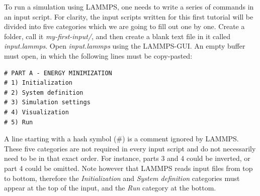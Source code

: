 \documentclass[9pt,tutorial]{livecoms}
\begin{document}
\noindent To run a simulation using LAMMPS, one needs to write a series of commands in an input script. For clarity, the input scripts written for this first tutorial will be divided into five categories which we are going to fill out one by one. Create a folder, call it \textit{my-first-input/}, and then create a blank text file in it called \textit{input.lammps}. Open \textit{input.lammps} using the LAMMPS-GUI. An empty buffer must open, in which the following lines must be copy-pasted:
{\normalsize \begin{verbatim}
# PART A - ENERGY MINIMIZATION
# 1) Initialization
# 2) System definition
# 3) Simulation settings
# 4) Visualization
# 5) Run
\end{verbatim}}
\noindent A line starting with a hash symbol ($\#$) is a comment ignored by LAMMPS. These five categories are not required in every input script and do not necessarily need to be in that exact order. For instance, parts 3 and 4 could be inverted, or part 4 could be omitted. Note however that LAMMPS reads input files from top to bottom, therefore the \textit{Initialization} and \textit{System definition} categories must appear at the top of the input, and the \textit{Run} category at the bottom.
\end{document}
